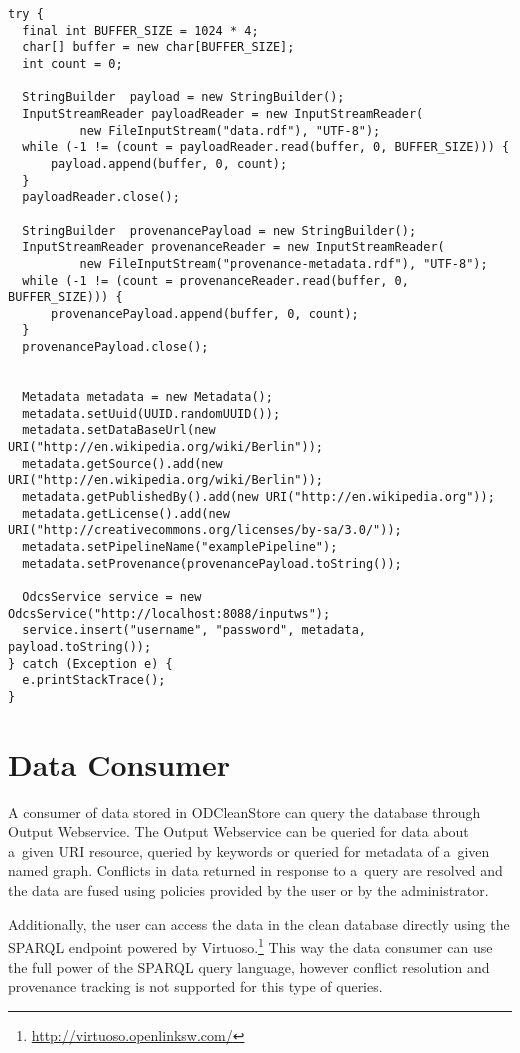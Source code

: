 \begin{lstlisting}[caption={Example usage of Input Webservice client library},label=lst:clientLibrary]
try {
  final int BUFFER_SIZE = 1024 * 4;
  char[] buffer = new char[BUFFER_SIZE];
  int count = 0;

  StringBuilder  payload = new StringBuilder();
  InputStreamReader payloadReader = new InputStreamReader(
          new FileInputStream("data.rdf"), "UTF-8");
  while (-1 != (count = payloadReader.read(buffer, 0, BUFFER_SIZE))) {
      payload.append(buffer, 0, count);
  }
  payloadReader.close();

  StringBuilder  provenancePayload = new StringBuilder();
  InputStreamReader provenanceReader = new InputStreamReader(
          new FileInputStream("provenance-metadata.rdf"), "UTF-8");
  while (-1 != (count = provenanceReader.read(buffer, 0, BUFFER_SIZE))) {
      provenancePayload.append(buffer, 0, count);
  }
  provenancePayload.close();


  Metadata metadata = new Metadata();
  metadata.setUuid(UUID.randomUUID());
  metadata.setDataBaseUrl(new URI("http://en.wikipedia.org/wiki/Berlin"));
  metadata.getSource().add(new URI("http://en.wikipedia.org/wiki/Berlin"));
  metadata.getPublishedBy().add(new URI("http://en.wikipedia.org"));
  metadata.getLicense().add(new URI("http://creativecommons.org/licenses/by-sa/3.0/")); 
  metadata.setPipelineName("examplePipeline"); 
  metadata.setProvenance(provenancePayload.toString()); 

  OdcsService service = new OdcsService("http://localhost:8088/inputws");
  service.insert("username", "password", metadata, payload.toString());
} catch (Exception e) {
  e.printStackTrace();
}
\end{lstlisting}

\section{Data Consumer}
\label{sec:outputWS}

A consumer of data stored in ODCleanStore can query the database through Output Webservice. The Output Webservice can be queried for data about a~given URI resource, queried by keywords or queried for metadata of a~given named graph. Conflicts in data returned in response to a~query are resolved and the data are fused using policies provided by the user or by the administrator.

Additionally, the user can access the data in the clean database directly using the SPARQL endpoint powered by Virtuoso.\footnote{\url{http://virtuoso.openlinksw.com/}} This way the data consumer can use the full power of the SPARQL query language, however conflict resolution and provenance tracking is not supported for this type of queries.

